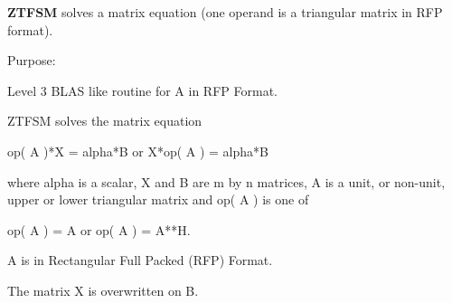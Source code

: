 {\bfseries Z\+T\+F\+S\+M} solves a matrix equation (one operand is a triangular matrix in R\+F\+P format). 

 \begin{DoxyParagraph}{Purpose\+: }
\begin{DoxyVerb} Level 3 BLAS like routine for A in RFP Format.

 ZTFSM  solves the matrix equation

    op( A )*X = alpha*B  or  X*op( A ) = alpha*B

 where alpha is a scalar, X and B are m by n matrices, A is a unit, or
 non-unit,  upper or lower triangular matrix  and  op( A )  is one  of

    op( A ) = A   or   op( A ) = A**H.

 A is in Rectangular Full Packed (RFP) Format.

 The matrix X is overwritten on B.\end{DoxyVerb}
 
\end{DoxyParagraph}

